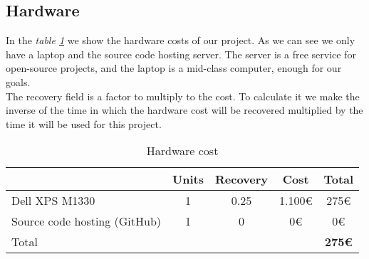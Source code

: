 \subsection{Hardware}
In the \emph{table \ref{tab:hard}} we show the hardware costs of our project. As we can see we only have a laptop and the source code hosting server.
The server is a free service for open-source projects, and the laptop is a mid-class computer, enough for our goals.\\
The recovery field is a factor to multiply to the cost. To calculate it we make the inverse of the time in which the hardware cost will be
recovered multiplied by the time it will be used for this project.
\begin{table}[h]
  \begin{center}
    \begin{tabular}{ l c c c | c |}
      \cline{2-5}
      & \multicolumn{1}{|l|}{Units} & \multicolumn{1}{|c|}{Recovery} & \multicolumn{1}{|c|}{Cost} & Total \\ \hline
      \multicolumn{1}{|l|}{Dell XPS M1330} & \multicolumn{1}{|c|}{1} & \multicolumn{1}{|c|}{0.25} &\multicolumn{1}{|c|}{1.100€} & 275€ \\ \hline
      \multicolumn{1}{|l|}{Source code hosting (GitHub)} & \multicolumn{1}{|c|}{1} & \multicolumn{1}{|c|}{0} &\multicolumn{1}{|c|}{0€} & 0€\\
      \hline
      \hline
      \multicolumn{1}{|l}{Total} & & & & {\bf 275€}\\
      \hline
    \end{tabular}
  \end{center}
  \caption{Hardware cost}
  \label{tab:hard}
\end{table}
